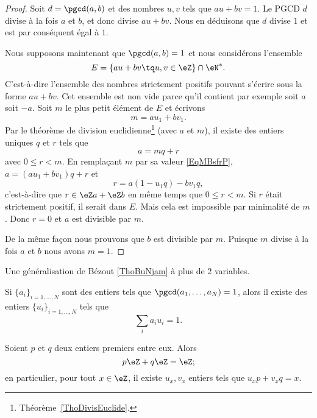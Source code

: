 \begin{proof}
	Soit \( d=\pgcd(a,b)\) et des nombres \( u,v\) tels que \( au+bv=1\). Le PGCD \( d\) divise à la fois \( a\) et \( b\), et donc divise \( au+bv\). Nous en déduisons que \( d\) divise \( 1\) et est par conséquent égal à \( 1\).

	Nous supposons maintenant que \( \pgcd(a,b)=1\) et nous considérons l'ensemble
	\begin{equation}
		E=\{ au+bv\tq u,v\in \eZ \}\cap \eN^*.
	\end{equation}
	C'est-à-dire l'ensemble des nombres strictement positifs pouvant s'écrire sous la forme \( au+bv\). Cet ensemble est non vide parce qu'il contient par exemple soit \( a\) soit \( -a\). Soit \( m\) le plus petit élément de \( E\) et écrivons
	\begin{equation}    \label{EqMBsfrP}
		m=au_1+bv_1.
	\end{equation}
	Par le théorème de division euclidienne\footnote{Théorème~\ref{ThoDivisEuclide}.} (avec \( a\) et \( m\)), il existe des entiers uniques \( q\) et \( r\) tels que
	\begin{equation}
		a=mq+r
	\end{equation}
	avec \( 0\leq r<m\). En remplaçant \( m\) par sa valeur \eqref{EqMBsfrP}, \( a=(au_1+bv_1)q+r\) et
	\begin{equation}
		r=a(1-u_1q)-bv_1q,
	\end{equation}
	c'est-à-dire que \( r\in \eZ a+\eZ b\) en même temps que \( 0\leq r<m\). Si \( r\) était strictement positif, il serait dans \( E\). Mais cela est impossible par minimalité de \( m\). Donc \( r=0\) et \( a\) est divisible par \( m\).

	De la même façon nous prouvons que \( b\) est divisible par \( m\). Puisque \( m\) divise à la fois \( a\) et \( b\) nous avons \( m=1\).
\end{proof}

Une généralisation de Bézout \ref{ThoBuNjam} à plus de \( 2\) variables.
\begin{proposition}     \label{PROPooWSMTooMdfqse}
	Si \( \{ a_i \}_{i=1,\ldots, N}\) sont des entiers tels que \( \pgcd(a_1,\ldots, a_N)=1\), alors il existe des entiers \( \{ u_i \}_{i=1,\ldots, N}\) tels que
	\begin{equation}
		\sum_ia_iu_i=1.
	\end{equation}
\end{proposition}

\begin{corollary}       \label{CorgEMtLj}
	Soient \( p\) et \( q\) deux entiers premiers entre eux. Alors
	\begin{equation}
		p\eZ+q\eZ=\eZ;
	\end{equation}
	en particulier, pour tout \( x \in \eZ \), il existe \( u_x, v_x \) entiers tels que \(u_x p + v_x q = x \).
\end{corollary}

